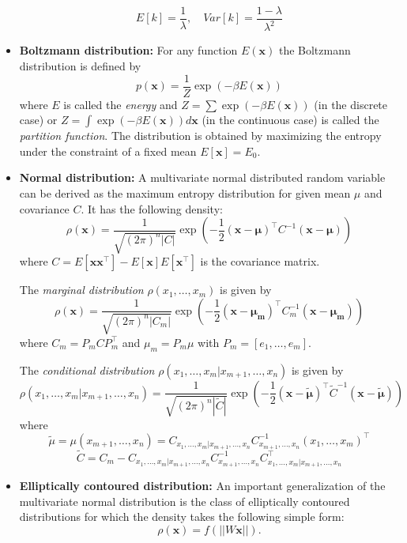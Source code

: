 \begin{itemize}
$$
E[k] = \frac{1}{\lambda}, \quad Var[k]= \frac{1-\lambda}{\lambda^2}
$$
\item {\bf Boltzmann distribution:} For any function $E(\mathbf{x})$ the Boltzmann distribution is defined by
$$
p(\mathbf{x}) = \frac{1}{Z} \exp(-\beta E(\mathbf{x})) 
$$
where $E$ is called the {\it energy} and $Z=\sum \exp(-\beta E(\mathbf{x}))$ (in the discrete case) or  $Z=\int \exp(-\beta E(\mathbf{x})) d\mathbf{x}$ (in the continuous case) is called the {\it partition function}. The distribution is obtained by maximizing the entropy under the constraint of a fixed mean $E[\mathbf{x}] = E_0$.

\item {\bf Normal distribution:} A multivariate normal distributed random variable can be derived as the maximum entropy distribution for given mean $\mu$ and covariance $C$. It has the following density:
$$
\rho(\mathbf{x}) = \frac{1}{\sqrt{(2\pi)^n |C|}} \exp\left( -\frac{1}{2} (\mathbf{x-\mu})^\top C^{-1} (\mathbf{x-\mu}) \right)
$$
where $C=E[\mathbf{xx}^\top]- E[\mathbf{x}] E[\mathbf{x}^\top]$ is the covariance matrix. 

The {\it marginal distribution} $\rho(x_1, \dots, x_m)$ is given by
$$
\rho(\mathbf{x}) = \frac{1}{\sqrt{(2\pi)^n |C_m|}} \exp\left( -\frac{1}{2} (\mathbf{x-\mu_m})^\top C_m^{-1} (\mathbf{x-\mu_m}) \right)
$$
where $C_m = P_mCP_m^\top$ and $\mu_m = P_m \mu$ with $P_m=[e_1, \dots, e_m]$.

The {\it conditional distribution} $\rho(x_1, \dots, x_m| x_{m+1}, \dots, x_n)$ is given by
$$
\rho(x_1, \dots, x_m| x_{m+1}, \dots, x_n) = \frac{1}{\sqrt{(2\pi)^n |\tilde C|}} \exp\left( -\frac{1}{2} (\mathbf{x-\tilde \mu})^\top \tilde C^{-1}(\mathbf{x-\tilde \mu}) \right)
$$
where
$$
\tilde \mu = \mu({x_{m+1}, \dots, x_n})= C_{x_1, \dots, x_m| x_{m+1}, \dots, x_n} C_{x_{m+1}, \dots, x_n}^{-1} (x_1, \dots, x_m)^\top
$$
$$
\tilde C = C_m - C_{x_1, \dots, x_m| x_{m+1}, \dots, x_n} C_{x_{m+1}, \dots, x_n}^{-1} C_{x_1, \dots, x_m| x_{m+1}, \dots, x_n}^\top
$$

\item {\bf Elliptically contoured distribution:} An important generalization of the multivariate normal distribution is the class of elliptically contoured distributions for which the density takes the following simple form:
$$
\rho(\mathbf{x}) = f(||W\mathbf{x}||) .
$$

\end{itemize}


\vfil 


